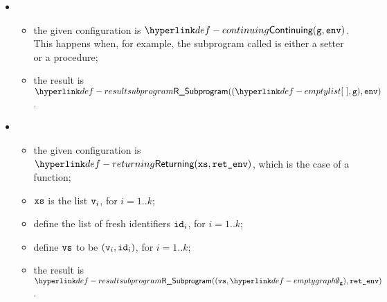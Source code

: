 \ProseParagraph
\OneApplies
\begin{itemize}
  \item {}
  \begin{itemize}
    \item the given configuration is $\Continuing(\vg, \env)$. This happens when,
    for example, the subprogram called is either a setter or a procedure;
    \item the result is $\ResultSubprogram((\emptylist, \vg), \env)$.
  \end{itemize}

  \item {}
  \begin{itemize}
    \item the given configuration is $\Returning(\xs, \retenv)$, which is the case of a function;
    \item $\texttt{xs}$ is the list $\texttt{v}_i$, for $i=1..k$;
    \item define the list of fresh identifiers $\texttt{id}_i$, for $i=1..k$;
    \item define $\texttt{vs}$ to be $(\texttt{v}_i, \texttt{id}_i)$, for $i=1..k$;
    \item the result is $\ResultSubprogram((\vvs, \emptygraph), \retenv)$.
  \end{itemize}
\end{itemize}

\FormallyParagraph
{}
